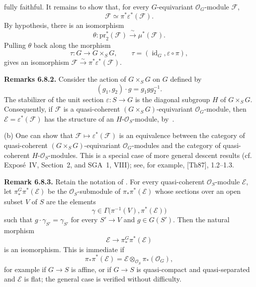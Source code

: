 fully faithful. It remains to show that, for every \(G\)-equivariant
\(\mathcal O_G\)-module \(\mathcal F\),
\[
  \mathcal F\simeq\pi^*\varepsilon^*(\mathcal F).
\]
By hypothesis, there is an isomorphism
\[
  \theta:\mathrm{pr}_2^*(\mathcal F)
  \xrightarrow{\ \sim\ }\mu^*(\mathcal F).
\]
Pulling \(\theta\) back along the morphism
\[
  \tau:G\longrightarrow G\times_SG,
  \qquad
  \tau=(\operatorname{id}_G,\varepsilon\circ\pi),
\]
gives an isomorphism
\(\mathcal F\xrightarrow{\sim}\pi^*\varepsilon^*(\mathcal F)\).

\medskip
\noindent{}\textbf{Remarks 6.8.2.}
 Consider the action of \(G\times_SG\) on \(G\) defined by
\[
  (g_1,g_2)\cdot g=g_1gg_2^{-1}.
\]
The stabilizer of the unit section \(\varepsilon:S\to G\) is the
diagonal subgroup \(H\) of \(G\times_SG\). Consequently, if
\(\mathcal F\) is a quasi-coherent
\((G\times_SG)\)-equivariant \(\mathcal O_G\)-module, then
\(\mathcal E=\varepsilon^*(\mathcal F)\) has the structure of an
\(H\)-\(\mathcal O_S\)-module, by~.

(b) One can show that
\(\mathcal F\mapsto\varepsilon^*(\mathcal F)\) is an equivalence
between the category of quasi-coherent
\((G\times_SG)\)-equivariant \(\mathcal O_G\)-modules and the category
of quasi-coherent \(H\)-\(\mathcal O_S\)-modules. This is a special
case of more general descent results (cf. Expos\'e~IV, Section~2, and
SGA~1, VIII); see, for example, [Th87], 1.2--1.3.

\medskip
\noindent{}\textbf{Remark 6.8.3.}
Retain the notation of . For every quasi-coherent
\(\mathcal O_S\)-module \(\mathcal E\), let
\(\pi_*^G\pi^*(\mathcal E)\) be the \(\mathcal O_S\)-submodule of
\(\pi_*\pi^*(\mathcal E)\) whose sections over an open subset \(V\)
of \(S\) are the elements
\[
  \gamma\in\Gamma\bigl(\pi^{-1}(V),\pi^*(\mathcal E)\bigr)
\]
such that \(g\cdot\gamma_{S'}=\gamma_{S'}\) for every \(S'\to V\) and
\(g\in G(S')\). Then the natural morphism
\[
  \mathcal E\longrightarrow\pi_*^G\pi^*(\mathcal E)
\]
is an isomorphism. This is immediate if
\[
  \pi_*\pi^*(\mathcal E)
  =\mathcal E\otimes_{\mathcal O_S}\pi_*(\mathcal O_G),
\]
for example if \(G\to S\) is affine, or if \(G\to S\) is
quasi-compact and quasi-separated and \(\mathcal E\) is flat; the
general case is verified without difficulty.

